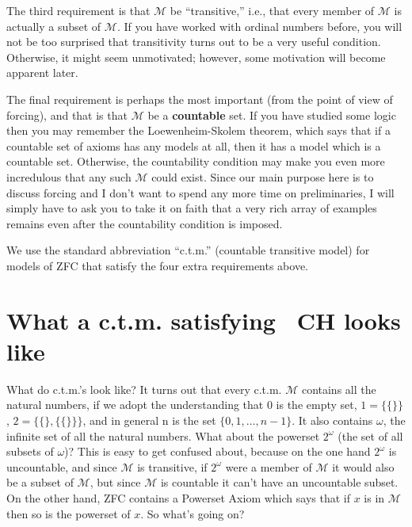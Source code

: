 \documentclass[10pt]{article}
\newcommand\axiom[1]{\textmd{#1}}
\theoremstyle{definition}
\begin{document}
The third requirement is that $\mathcal M$ be ``transitive,'' i.e., that every member of $\mathcal M$ is actually a subset of $\mathcal M$. If you have worked with ordinal numbers before, you will not be too surprised that transitivity turns out to be a very useful condition. Otherwise, it might seem unmotivated; however, some motivation will become apparent later.

The final requirement is perhaps the most important (from the point of view of forcing), and that is that $\mathcal M$ be a \textbf{countable} set. If you have studied some logic then you may remember the Loewenheim-Skolem theorem, which says that if a countable set of axioms has any models at all, then it has a model which is a countable set. Otherwise, the countability condition may make you even more incredulous that any such $\mathcal M$ could exist. Since our main purpose here is to discuss forcing and I don't want to spend any more time on preliminaries, I will simply have to ask you to take it on faith that a very rich array of examples remains even after the countability condition is imposed.

We use the standard abbreviation ``c.t.m.'' (countable transitive model) for models of \axiom{ZFC} that satisfy the four extra requirements above.


\section{What a c.t.m. satisfying \axiom{~CH} looks like}

What do c.t.m.'s look like? It turns out that every c.t.m. $\mathcal M$ contains all the natural numbers, if we adopt the understanding that 0 is the empty set, $1 = \{\{\}\}$, $2 = \{\{\}, \{\{\}\}\}$, and in general n is the set $\{0, 1, \ldots, n-1\}$. It also contains $\omega$, the infinite set of all the natural numbers. What about the powerset $2^\omega$ (the set of all subsets of $\omega$)? This is easy to get confused about, because on the one hand $2^\omega$ is uncountable, and since $\mathcal M$ is transitive, if $2^\omega$ were a member of $\mathcal M$ it would also be a subset of $\mathcal M$, but since $\mathcal M$ is countable it can't have an uncountable subset. On the other hand, \axiom{ZFC} contains a Powerset Axiom which says that if $x$ is in $\mathcal M$ then so is the powerset of $x$. So what's going on?
\end{document}
